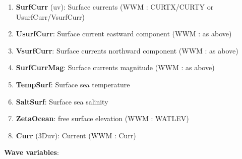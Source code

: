 \documentclass[12pt]{amsart}
\begin{document}
\begin{enumerate}
\item {\bf SurfCurr} (uv): Surface currents (WWM : CURTX/CURTY or UsurfCurr/VsurfCurr)
\item {\bf UsurfCurr}: Surface current eastward component (WWM : as above)
\item {\bf VsurfCurr}: Surface currents northward component (WWM : as above)
\item {\bf SurfCurrMag}: Surface currents magnitude (WWM : as above)
\item {\bf TempSurf}: Surface sea temperature
\item {\bf SaltSurf}: Surface sea salinity
\item {\bf ZetaOcean}: free surface elevation (WWM : WATLEV)
\item {\bf Curr} (3Duv): Current (WWM : Curr)
\end{enumerate}
{\bf Wave variables}:
\end{document}
